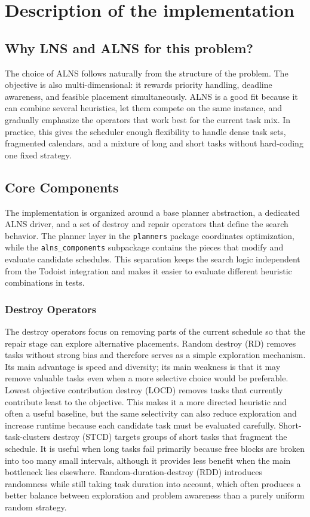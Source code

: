 \documentclass{article}
\begin{document}
\section{Description of the implementation}

\subsection{Why LNS and ALNS for this problem?}
The choice of ALNS follows naturally from the structure of the problem. The objective is also multi-dimensional: it rewards priority handling, deadline awareness, and feasible placement simultaneously. ALNS is a good fit because it can combine several heuristics, let them compete on the same instance, and gradually emphasize the operators that work best for the current task mix. In practice, this gives the scheduler enough flexibility to handle dense task sets, fragmented calendars, and a mixture of long and short tasks without hard-coding one fixed strategy.

\subsection{Core Components}
The implementation is organized around a base planner abstraction, a dedicated ALNS driver, and a set of destroy and repair operators that define the search behavior. The planner layer in the \texttt{planners} package coordinates optimization, while the \texttt{alns\_components} subpackage contains the pieces that modify and evaluate candidate schedules. This separation keeps the search logic independent from the Todoist integration and makes it easier to evaluate different heuristic combinations in tests.

\subsubsection{Destroy Operators}
The destroy operators focus on removing parts of the current schedule so that the repair stage can explore alternative placements. Random destroy (RD) removes tasks without strong bias and therefore serves as a simple exploration mechanism. Its main advantage is speed and diversity; its main weakness is that it may remove valuable tasks even when a more selective choice would be preferable. Lowest objective contribution destroy (LOCD) removes tasks that currently contribute least to the objective. This makes it a more directed heuristic and often a useful baseline, but the same selectivity can also reduce exploration and increase runtime because each candidate task must be evaluated carefully. Short-task-clusters destroy (STCD) targets groups of short tasks that fragment the schedule. It is useful when long tasks fail primarily because free blocks are broken into too many small intervals, although it provides less benefit when the main bottleneck lies elsewhere. Random-duration-destroy (RDD) introduces randomness while still taking task duration into account, which often produces a better balance between exploration and problem awareness than a purely uniform random strategy.
\end{document}
